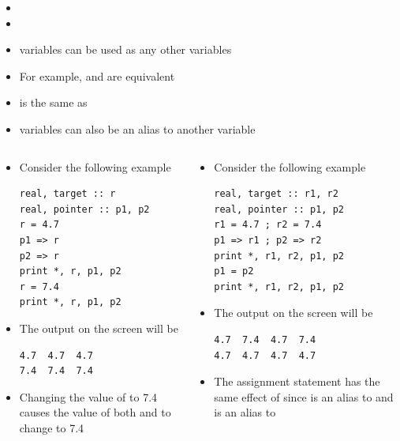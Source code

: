 \documentclass[10pt,t]{beamer}
\begin{document}
\begin{frame}
\begin{itemize}
    \item[] 
    \item[] 
    \item {} variables can be used as any other variables
    \item[] For example,  and  are equivalent
    \item[]  is the same as 
    \item {} variables can also be an alias to another  variable
  \end{itemize}
  \framebreak
  \begin{columns}[t]
    \column{5.5cm}
    \begin{bblock}{}
      \begin{itemize}
        \item Consider the following example
          \begin{lstlisting}[language={[90]Fortran},basicstyle=\fontsize{5}{6}\selectfont\ttfamily]
real, target :: r
real, pointer :: p1, p2
r = 4.7
p1 => r
p2 => r
print *, r, p1, p2
r = 7.4
print *, r, p1, p2
          \end{lstlisting}
        \item The output on the screen will be
          \begin{Verbatim}[fontsize=\fontsize{6}{7}\selectfont,formatcom=\color{indigo}]
4.7  4.7  4.7
7.4  7.4  7.4
          \end{Verbatim}
        \item Changing the value of  to 7.4 causes the value of both  and  to change to 7.4
      \end{itemize}
    \end{bblock}
    \column{5.5cm}
    \begin{bblock}{}
      \begin{itemize}
        \item Consider the following example
          \begin{lstlisting}[language={[90]Fortran},basicstyle=\fontsize{5}{6}\selectfont\ttfamily]
real, target :: r1, r2
real, pointer :: p1, p2
r1 = 4.7 ; r2 = 7.4
p1 => r1 ; p2 => r2
print *, r1, r2, p1, p2
p1 = p2
print *, r1, r2, p1, p2
          \end{lstlisting}
        \item The output on the screen will be
          \begin{Verbatim}[fontsize=\fontsize{6}{7}\selectfont,formatcom=\color{indigo}]
4.7  7.4  4.7  7.4
4.7  4.7  4.7  4.7
          \end{Verbatim}
        \item The assignment statement  has the same effect of  since  is an alias to  and  is an alias to 
      \end{itemize}
    \end{bblock}
  \end{columns}


\end{frame}
\end{document}
